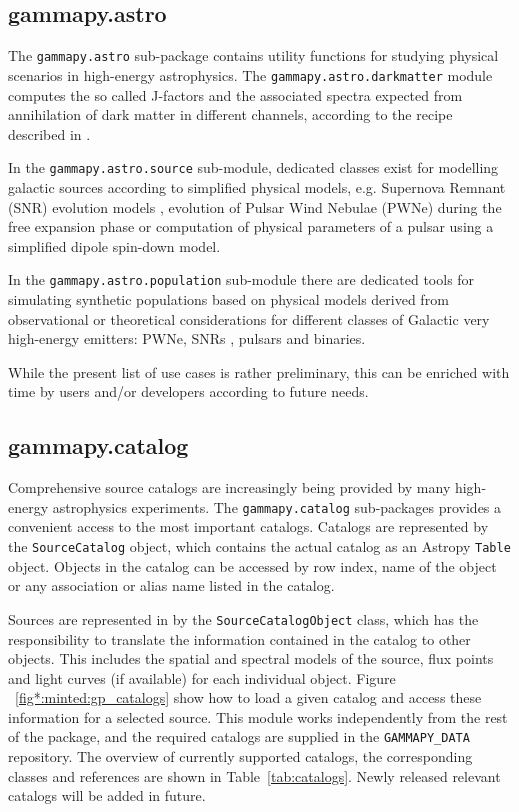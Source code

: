\documentclass[longauth]{aa}
\newcommand{\code}[1]{\texttt{#1}}
\begin{document}
\subsection{gammapy.astro}
\label{ssec:gammapy-astro}
The \code{gammapy.astro} sub-package contains utility functions for studying physical
scenarios in high-energy astrophysics. The \code{gammapy.astro.darkmatter} module
computes the so called J-factors and the associated \gammaray spectra expected
from annihilation of dark matter in different channels, according to the recipe
described in \cite{2011JCAP...03..051C}.

In the \code{gammapy.astro.source} sub-module, dedicated classes exist for modelling
galactic \gammaray sources according to simplified physical models, e.g. Supernova Remnant (SNR) evolution
models \citep{1950RSPSA.201..159T, 1999ApJS..120..299T}, evolution of Pulsar Wind Nebulae (PWNe) during the
free expansion phase \citep{2006ARA&A..44...17G} or computation
of physical parameters of a pulsar using a simplified dipole spin-down model.

In the \code{gammapy.astro.population} sub-module there are dedicated tools
for simulating synthetic populations based on physical models derived from
observational or theoretical considerations for different classes of Galactic
very high-energy \gammaray emitters: PWNe, SNRs \cite{1998ApJ...504..761C},
pulsars \cite{2006ApJ...643..332F, 2006MNRAS.372..777L, 2004A&A...422..545Y}
and \gammaray binaries.

While the present list of use cases is rather preliminary, this can be enriched
with time by users and/or developers according to future needs.

\subsection{gammapy.catalog}
\label{ssec:gammapy-catalog}
Comprehensive source catalogs are increasingly being provided by many high-energy
 astrophysics experiments. The \code{gammapy.catalog} sub-packages
provides a convenient access to the most important \gammaray catalogs.
Catalogs are represented by the \code{SourceCatalog} object, which
contains the actual catalog as an Astropy \code{Table} object.
Objects in the catalog can be accessed by row index, name of the
object or any association or alias name listed in the catalog.

Sources are represented in \gammapy by the \code{SourceCatalogObject}
class, which has the responsibility to translate the information
contained in the catalog to other \gammapy objects. This includes
the spatial and spectral models of the source, flux points and
light curves (if available) for each individual object. Figure ~\ref{fig*:minted:gp_catalogs}
show how to load a given catalog and access these information for a selected source.
This module works independently from the rest of the package, and the required
catalogs are supplied in the \code{GAMMAPY\_DATA} repository.
The overview of currently supported catalogs, the corresponding
\gammapy classes and references are shown in Table~\ref{tab:catalogs}.
Newly released relevant catalogs will be added in future.
\end{document}
